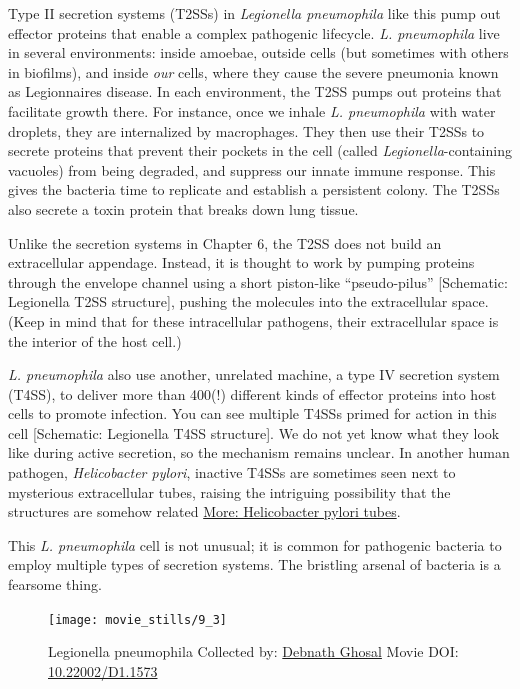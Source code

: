 \documentclass[]{tufte-book}
\begin{document}
Type II secretion systems (T2SSs) in \emph{Legionella pneumophila} like
this pump out effector proteins that enable a complex pathogenic
lifecycle. \emph{L. pneumophila} live in several environments: inside
amoebae, outside cells (but sometimes with others in biofilms), and
inside \emph{our} cells, where they cause the severe pneumonia known as
Legionnaires disease. In each environment, the T2SS pumps out proteins
that facilitate growth there. For instance, once we inhale \emph{L.
pneumophila} with water droplets, they are internalized by macrophages.
They then use their T2SSs to secrete proteins that prevent their pockets
in the cell (called \emph{Legionella}-containing vacuoles) from being
degraded, and suppress our innate immune response. This gives the
bacteria time to replicate and establish a persistent colony. The T2SSs
also secrete a toxin protein that breaks down lung tissue.

Unlike the secretion systems in Chapter 6, the T2SS does not build an
extracellular appendage. Instead, it is thought to work by pumping
proteins through the envelope channel using a short piston-like
``pseudo-pilus'' {[}Schematic: Legionella T2SS structure{]}, pushing the
molecules into the extracellular space. (Keep in mind that for these
intracellular pathogens, their extracellular space is the interior of
the host cell.)

\emph{L. pneumophila} also use another, unrelated machine, a type IV
secretion system (T4SS), to deliver more than 400(!) different kinds of
effector proteins into host cells to promote infection. You can see
multiple T4SSs primed for action in this cell {[}Schematic: Legionella
T4SS structure{]}. We do not yet know what they look like during active
secretion, so the mechanism remains unclear. In another human pathogen,
\emph{Helicobacter pylori}, inactive T4SSs are sometimes seen next to
mysterious extracellular tubes, raising the intriguing possibility that
the structures are somehow related
\protect\hyperlink{Helicobacter_pylori_tubes}{More: Helicobacter pylori
tubes}.

This \emph{L. pneumophila} cell is not unusual; it is common for
pathogenic bacteria to employ multiple types of secretion systems. The
bristling arsenal of bacteria is a fearsome thing.





\begin{figure}
\texttt{[image: movie\_stills/9\_3]} \caption[Legionella pneumophila Collected by:
\protect\hyperlink{debnath_ghosal}{Debnath Ghosal} Movie DOI:
\href{https://doi.org/10.22002/D1.1573}{10.22002/D1.1573}]{Legionella pneumophila Collected by:
\protect\hyperlink{debnath_ghosal}{Debnath Ghosal} Movie DOI:
\href{https://doi.org/10.22002/D1.1573}{10.22002/D1.1573}}\label{fig:9-3}
\end{figure}
\end{document}
